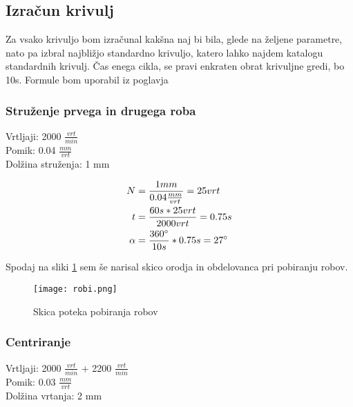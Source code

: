 \subsection{Izračun krivulj}
Za vsako krivuljo bom izračunal kakšna naj bi bila, glede na 
željene parametre, nato pa izbral najbližjo standardno krivuljo, 
katero lahko najdem katalogu standardnih krivulj. 
Čas enega cikla, se pravi enkraten obrat krivuljne gredi, bo 10s.
Formule bom uporabil iz poglavja 
    
    \subsubsection{Struženje prvega in drugega roba}
        Vrtljaji: 2000 \( \frac{vrt}{min} \) \\
        Pomik: 0.04 \( \frac{mm}{vrt} \) \\
        Dolžina struženja: 1 mm

        \begin{equation}
            \begin{split}
                N &= \frac{1mm}{0.04\frac{mm}{vrt}} = 25 vrt \\
                t &= \frac{60s * 25vrt}{2000vrt} = 0.75 s \\
                \alpha &= \frac{360 \degree}{10 s} * 0.75s = 27 \degree \\
            \end{split}
        \end{equation}

        Spodaj na sliki \ref{shema_robov} sem še narisal skico orodja
        in obdelovanca pri pobiranju robov.

        \begin{figure}[H]
            \begin{center}
                \texttt{[image: robi.png]}
                \caption{Skica poteka pobiranja robov
                \cite{lasten}}
                \label{shema_robov}
            \end{center}
        \end{figure}

        \newpage
    
    \subsubsection{Centriranje}
        Vrtljaji: 2000 \( \frac{vrt}{min} \) + 2200 \( \frac{vrt}{min} \)\\
        Pomik: 0.03 \( \frac{mm}{vrt} \) \\
        Dolžina vrtanja: 2 mm
        
